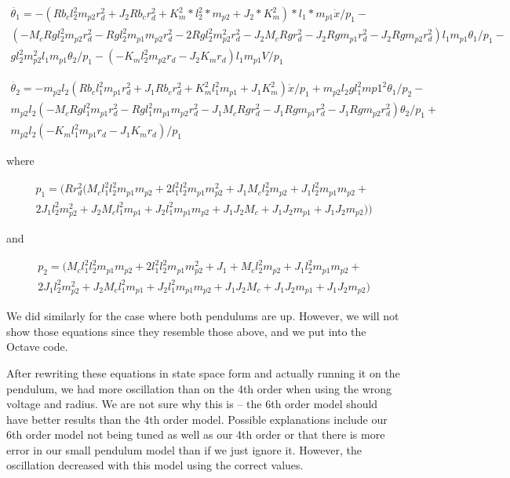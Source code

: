 \documentclass{article}
\begin{document}
\begin{multline} 
\label{eqn6th5}
\ddot{\theta_1} = -(R b_c l_2^2 m_{p2} r_d^2+J_2 R b_c r_d^2+K_m^2*l_2^2*m_{p2}+J_2*K_m^2)*l_1*m_{p1} \dot{x}/p_1 -\\(-M_c R g l_2^2 m_{p2} r_d^2-R g l_2^2 m_{p1} m_{p2} r_d^2-2 R g l_2^2 m_{p2}^2 r_d^2-J_2 M_c R g r_d^2-J_2 R g m_{p1} r_d^2-J_2 R g m_{p2} r_d^2) l_1 m_{p1} \theta_1 /p_1-\\g l_2^2 m_{p2}^2 l_1 m_{p1} \theta_2/p_1-(-K_m l_2^2 m_{p2} r_d-J_2 K_m r_d) l_1 m_{p1} V/p_1
\end{multline}

\begin{multline} 
\label{eqn6th6}
\ddot{\theta_2} = -m_{p2} l_2 (R b_c l_1^2 m_{p1} r_d^2+J_1 R b_c r_d^2+K_m^2 l_1^2 m_{p1}+J_1 K_m^2)\dot{x}/p_1 +m_{p2} l_2 g l_1^2 m{p1}^2 \theta_1/p_2 - \\m_{p2} l_2 (-M_c R g l_1^2 m_{p1} r_d^2-R g l_1^2 m_{p1} m_{p2} r_d^2-J_1 M_c R g r_d^2-J_1 R g m_{p1} r_d^2-J_1 R g m_{p2} r_d^2) \theta_2/p_1 + \\m_{p2} l_2 (-K_m l_1^2 m_{p1} r_d-J_1 K_m r_d)/p_1
\end{multline}

where 

\begin{multline} 
\label{p1}
p_1 = (R r_d^2 (M_c l_1^2 l_2^2 m_{p1} m_{p2}+2 l_1^2 l_2^2 m_{p1} m_{p2}^2+J_1 M_c l_2^2 m_{p2}+J_1 l_2^2 m_{p1} m_{p2}+\\2 J_1 l_2^2 m_{p2}^2+J_2 M_c l_1^2 m_{p1}+J_2 l_1^2 m_{p1} m_{p2}+J_1 J_2 M_c+J_1 J_2 m_{p1}+J_1 J_2 m_{p2}))
\end{multline}

and 

\begin{multline}
\label{p2}
 p_2 = (M_c l_1^2 l_2^2 m_{p1}m_{p2}+2 l_1^2 l_2^2 m_{p1} m_{p2}^2+J_1+M_c l_2^2 m_{p2}+J_1 l_2^2 m_{p1} m_{p2}+\\2 J_1 l_2^2 m_{p2}^2+J_2 M_c l_1^2 m_{p1}+J_2 l_1^2 m_{p1} m_{p2}+J_1 J_2 M_c+J_1 J_2 m_{p1}+J_1 J_2 m_{p2})
\end{multline}

We did similarly for the case where both pendulums are up. However, we will not show those equations since they resemble those above, and we put into the Octave code.

After rewriting these equations in state space form and actually running it on the pendulum, we had more oscillation than on the 4th order when using the wrong voltage and radius. We are not sure why this is -- the 6th order model should have better results than the 4th order model. Possible explanations include our 6th order model not being tuned as well as our 4th order or that there is more error in our small pendulum model than if we just ignore it. However, the oscillation decreased with this model using the correct values.
\end{document}
